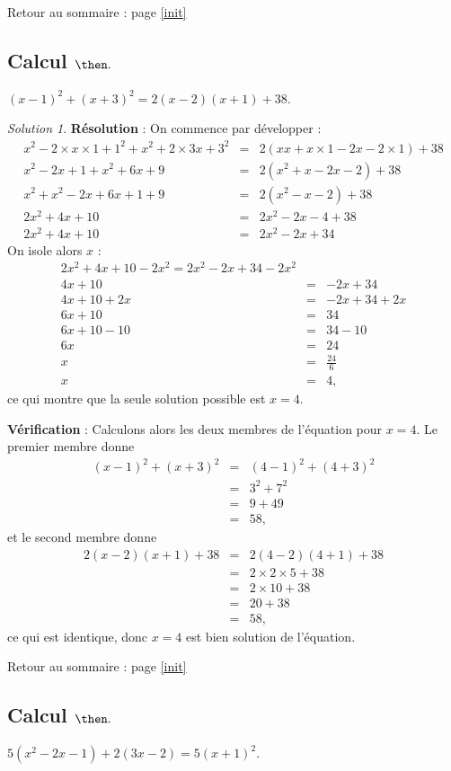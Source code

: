 \documentclass[14pt]{article}
\theoremstyle{remark}
\newtheorem*{sol}{Solution}
\newcounter{n}
\renewcommand{\it}{Retour au sommaire : page \ref{init}
	\subsection{Calcul $ \mathbf{ \then}.$}\label{\then} \stepcounter{n} }
\theoremstyle{plain}
\begin{document}
\it $(x-1)^2+(x+3)^2= 2(x-2)(x+1)+38$.
\begin{sol}
\textbf{Résolution} : On commence par développer : 
\begin{eqnarray*} x^2-2\times x \times 1 +1^2 + x^2 + 2\times 3x + 3^2 &=& 2(xx +x\times1-2 x -2\times 1) +38\\
x^2-2x+1+x^2+6x+9 &=& 2(x^2+x-2x-2)+38\\
x^2+x^2-2x+6x+1+9 &=& 2(x^2-x-2)+38\\
2x^2+4x+10 &=& 2x^2-2x-4 + 38\\
2x^2+4x+10 &=& 2x^2-2x+34
\end{eqnarray*}
On isole alors $x$ : 
\begin{eqnarray*}
2x^2+4x+10 - 2x^2= 2x^2-2x+34-2x^2\\
4x+10 &=& -2x+34\\
4x+10+2x &=& -2x+34+2x\\
6x+10 &=& 34\\
6x+10-10&=&34-10\\
6x&=& 24\\
x&=& \frac{24}6\\
x&=& 4,
\end{eqnarray*}ce qui montre que la seule solution possible est $x=4$.

\textbf{Vérification} : Calculons alors les deux membres de l'équation pour $x=4$. Le premier membre donne 
\begin{eqnarray*}(x-1)^2+(x+3)^2 &=& (4-1)^2+(4+3)^2 \\
&=& 3^2 + 7^2 \\
&=& 9 + 49 \\
&=& 58,\end{eqnarray*}
et le second membre donne \begin{eqnarray*}
2(x-2)(x+1)+38 &=& 2(4-2)(4+1)+38\\
&=& 2\times2\times5+38\\
&=& 2\times 10+38\\
&=& 20+38\\
&=& 58,\end{eqnarray*} ce qui est identique, donc $x=4$ est bien solution de l'équation.
\end{sol}
\it $5(x^2-2x-1)+2(3x-2)=5(x+1)^2$.
\end{document}
